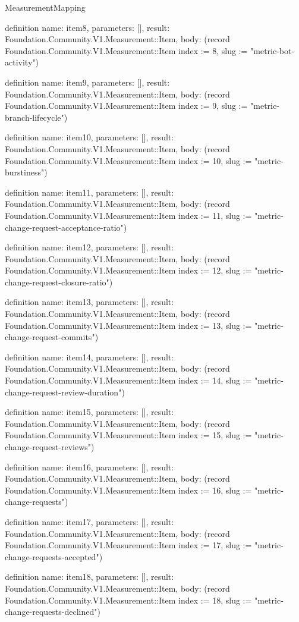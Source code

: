 \begin{lexlean}{MeasurementMapping}
\begin{semanticmodule}
definition{
  name: item8,
  parameters: [],
  result: Foundation.Community.V1.Measurement::Item,
  body: (record Foundation.Community.V1.Measurement::Item {index := 8, slug := "metric-bot-activity"})
}

definition{
  name: item9,
  parameters: [],
  result: Foundation.Community.V1.Measurement::Item,
  body: (record Foundation.Community.V1.Measurement::Item {index := 9, slug := "metric-branch-lifecycle"})
}

definition{
  name: item10,
  parameters: [],
  result: Foundation.Community.V1.Measurement::Item,
  body: (record Foundation.Community.V1.Measurement::Item {index := 10, slug := "metric-burstiness"})
}

definition{
  name: item11,
  parameters: [],
  result: Foundation.Community.V1.Measurement::Item,
  body: (record Foundation.Community.V1.Measurement::Item {index := 11, slug := "metric-change-request-acceptance-ratio"})
}

definition{
  name: item12,
  parameters: [],
  result: Foundation.Community.V1.Measurement::Item,
  body: (record Foundation.Community.V1.Measurement::Item {index := 12, slug := "metric-change-request-closure-ratio"})
}

definition{
  name: item13,
  parameters: [],
  result: Foundation.Community.V1.Measurement::Item,
  body: (record Foundation.Community.V1.Measurement::Item {index := 13, slug := "metric-change-request-commits"})
}

definition{
  name: item14,
  parameters: [],
  result: Foundation.Community.V1.Measurement::Item,
  body: (record Foundation.Community.V1.Measurement::Item {index := 14, slug := "metric-change-request-review-duration"})
}

definition{
  name: item15,
  parameters: [],
  result: Foundation.Community.V1.Measurement::Item,
  body: (record Foundation.Community.V1.Measurement::Item {index := 15, slug := "metric-change-request-reviews"})
}

definition{
  name: item16,
  parameters: [],
  result: Foundation.Community.V1.Measurement::Item,
  body: (record Foundation.Community.V1.Measurement::Item {index := 16, slug := "metric-change-requests"})
}

definition{
  name: item17,
  parameters: [],
  result: Foundation.Community.V1.Measurement::Item,
  body: (record Foundation.Community.V1.Measurement::Item {index := 17, slug := "metric-change-requests-accepted"})
}

definition{
  name: item18,
  parameters: [],
  result: Foundation.Community.V1.Measurement::Item,
  body: (record Foundation.Community.V1.Measurement::Item {index := 18, slug := "metric-change-requests-declined"})
}


\end{semanticmodule}
\end{lexlean}
